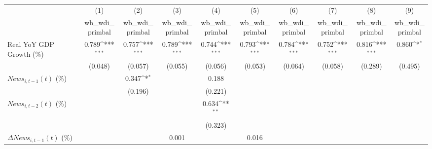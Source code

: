 {
\def\sym#1{\ifmmode^{#1}\else\(^{#1}\)\fi}
\begin{tabular}{l*{9}{c}}
\toprule
                    &\multicolumn{1}{c}{(1)}&\multicolumn{1}{c}{(2)}&\multicolumn{1}{c}{(3)}&\multicolumn{1}{c}{(4)}&\multicolumn{1}{c}{(5)}&\multicolumn{1}{c}{(6)}&\multicolumn{1}{c}{(7)}&\multicolumn{1}{c}{(8)}&\multicolumn{1}{c}{(9)}\\
                    &\multicolumn{1}{c}{wb_wdi_primbal}&\multicolumn{1}{c}{wb_wdi_primbal}&\multicolumn{1}{c}{wb_wdi_primbal}&\multicolumn{1}{c}{wb_wdi_primbal}&\multicolumn{1}{c}{wb_wdi_primbal}&\multicolumn{1}{c}{wb_wdi_primbal}&\multicolumn{1}{c}{wb_wdi_primbal}&\multicolumn{1}{c}{wb_wdi_primbal}&\multicolumn{1}{c}{wb_wdi_primbal}\\
\midrule
Real YoY GDP Growth (\%)&       0.789\sym{***}&       0.757\sym{***}&       0.789\sym{***}&       0.744\sym{***}&       0.793\sym{***}&       0.784\sym{***}&       0.752\sym{***}&       0.816\sym{***}&       0.860\sym{*}  \\
                    &     (0.048)         &     (0.057)         &     (0.055)         &     (0.056)         &     (0.053)         &     (0.064)         &     (0.058)         &     (0.289)         &     (0.495)         \\
\addlinespace
$ News_{i,t-1}(t)$ (\%)&                     &       0.347\sym{*}  &                     &       0.188         &                     &                     &                     &                     &                     \\
                    &                     &     (0.196)         &                     &     (0.221)         &                     &                     &                     &                     &                     \\
\addlinespace
$ News_{i,t-2}(t)$ (\%)&                     &                     &                     &       0.634\sym{**} &                     &                     &                     &                     &                     \\
                    &                     &                     &                     &     (0.323)         &                     &                     &                     &                     &                     \\
\addlinespace
$ \Delta News_{i,t-1}(t)$ (\%)&                     &                     &       0.001         &                     &       0.016         &                     &                     &                     &                     \\

\end{tabular}}
